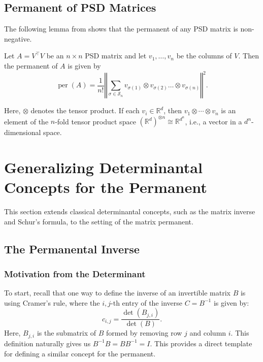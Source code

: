\documentclass[11pt]{article}
\theoremstyle{definition}
\DeclareMathOperator{\per}{per}
\newcommand{\norm}[1]{\left\Vert#1\right\Vert}           %
\begin{document}
\subsection{Permanent of PSD Matrices} \label{lem:psd-perm}
The following lemma from \cite{marcus1962inequalities} shows that the permanent of any PSD matrix is non-negative.
\begin{theorem}
    Let $A = V^\top V$ be an $n \times n$ PSD matrix and let $v_1, \ldots, v_n$ be the columns of $V$. Then the permanent of $A$ is given by
    \begin{equation*}
        \per(A) = \frac{1}{n!} \norm{\sum_{\sigma \in \mathcal{S}_n} v_{\sigma(1)} \otimes v_{\sigma(2)} \ldots \otimes v_{\sigma(n)}}^2.
    \end{equation*}
\end{theorem}
\noindent
Here, $\otimes$ denotes the tensor product. If each $v_i \in \mathbb{R}^d$, then 
$v_{1} \otimes \cdots \otimes v_{n}$ is an element of the $n$-fold tensor product space 
$(\mathbb{R}^d)^{\otimes n} \cong \mathbb{R}^{d^n}$, i.e., a vector in a $d^n$-dimensional space.


\section{Generalizing Determinantal Concepts for the Permanent} \label{sec:perm-schur}

This section extends classical determinantal concepts, such as the matrix inverse and Schur's formula, to the setting of the matrix permanent.

\subsection{The Permanental Inverse}
\label{sec:perm-inv}
\subsubsection{Motivation from the Determinant}
To start, recall that one way to define the inverse of an invertible matrix $B$ is using Cramer's rule, where the $i,j$-th entry of the inverse $C = B^{-1}$ is given by:
\begin{equation*}
	c_{i,j} = \frac{\det(B_{j,i})}{\det(B)}.
\end{equation*}
Here, $B_{j,i}$ is the submatrix of $B$ formed by removing row $j$ and column $i$. This definition naturally gives us $B^{-1}B = BB^{-1} = I$. This provides a direct template for defining a similar concept for the permanent.
\end{document}
